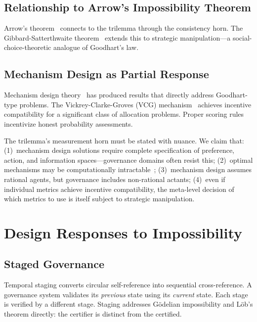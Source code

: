 \documentclass[12pt,a4paper]{article}
\begin{document}
\subsection{Relationship to Arrow's Impossibility Theorem}

Arrow's theorem~\cite{Arrow1950} connects to the trilemma through the
consistency horn. The Gibbard-Satterthwaite
theorem~\cite{Gibbard1973,Satterthwaite1975} extends this to strategic
manipulation---a social-choice-theoretic analogue of Goodhart's law.

\subsection{Mechanism Design as Partial Response}
\label{sec:mechanism}

Mechanism design theory~\cite{Hurwicz1960,Maskin1999,Myerson1981} has produced
results that directly address Goodhart-type problems. The Vickrey-Clarke-Groves
(VCG) mechanism~\cite{Vickrey1961,Clarke1971,Groves1973} achieves incentive
compatibility for a significant class of allocation problems. Proper scoring
rules~\cite{Savage1971,GneitingRaftery2007} incentivize honest probability
assessments.

The trilemma's measurement horn must be stated with nuance. We claim that:
(1)~mechanism design solutions require complete specification of preference,
action, and information spaces---governance domains often resist this;
(2)~optimal mechanisms may be computationally
intractable~\cite{NisanRonen2001}; (3)~mechanism design assumes rational
agents, but governance includes non-rational actants; (4)~even if individual
metrics achieve incentive compatibility, the meta-level decision of which
metrics to use is itself subject to strategic manipulation.

\section{Design Responses to Impossibility}

\subsection{Staged Governance}

Temporal staging converts circular self-reference into sequential
cross-reference. A governance system validates its \emph{previous} state
using its \emph{current} state. Each stage is verified by a different stage.
Staging addresses G\"{o}delian impossibility and L\"{o}b's theorem directly:
the certifier is distinct from the certified.
\end{document}
